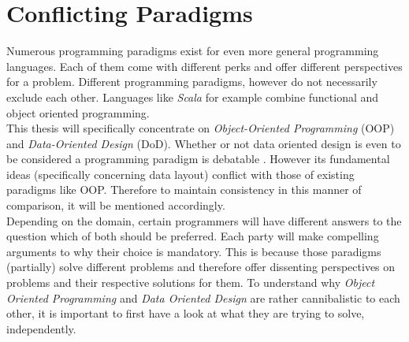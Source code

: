 \chapter{Conflicting Paradigms}
Numerous programming paradigms exist for even more general programming languages. Each of them come with different perks and offer different perspectives for a problem. Different programming paradigms, however do not necessarily exclude each other. Languages like \textit{Scala} for example combine functional and object oriented programming.\\
This thesis will specifically concentrate on \textit{Object-Oriented Programming} (OOP) and \textit{Data-Oriented Design} (DoD). Whether or not data oriented design is even to be considered a programming paradigm is debatable . However its fundamental ideas (specifically concerning data layout) conflict with those of existing paradigms like OOP. Therefore to maintain consistency in this manner of comparison, it will be mentioned accordingly.\\ 
Depending on the domain, certain programmers will have different answers to the question which of both should be preferred. Each party will make compelling arguments to why their choice is mandatory. This is because those paradigms (partially) solve different problems and therefore offer dissenting perspectives on problems and their respective solutions for them.
To understand why \textit{Object Oriented Programming} and \textit{Data Oriented Design} are rather cannibalistic to each other, it is important to first have a look at what they are trying to solve, independently.

